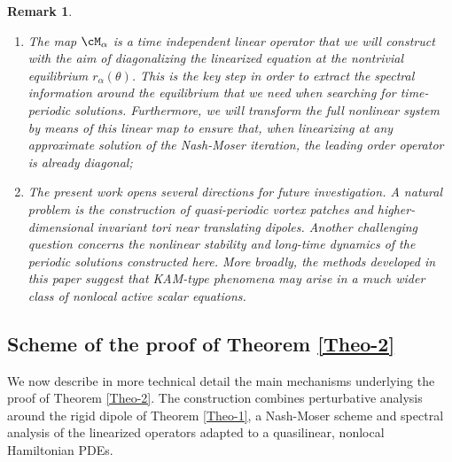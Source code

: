 \documentclass[a4paper,reqno,10pt]{article}
\newtheorem{rem}{Remark}[section]
\begin{document}
\begin{rem}
\begin{enumerate}[label=(\roman*)]
On the other hand, the mode $\tJ=1$ is excluded as it is degenerate. Nevertheless, the existence of solutions that are mode-1 time-periodic perturbations of steady solutions might be investigated without preserving the translation invariance of the dipole and by performing a more refined analysis close to the degeneracy;
\item The map $\cM_{\alpha}$ is a time independent linear operator that we will construct with the aim of diagonalizing the linearized equation at the nontrivial equilibrium $r_\alpha(\theta)$. This is the key step in order to extract the spectral information around the equilibrium that we need when searching for time-periodic solutions. Furthermore, we will transform the full nonlinear system by means of this linear map to ensure that, when linearizing at any approximate solution of the Nash-Moser iteration, the leading order operator is already diagonal; 
\item The present work opens several directions for future investigation. 
A natural problem is the construction of quasi-periodic vortex patches and higher-dimensional invariant tori near translating dipoles. 
Another challenging question concerns the nonlinear stability and long-time dynamics of the periodic solutions constructed here. 
More broadly, the methods developed in this paper suggest that KAM-type phenomena may arise in a much wider class of nonlocal active scalar equations.
\end{enumerate}
\end{rem}


\subsection{Scheme of the proof of Theorem \ref{Theo-2}}

We now describe in more technical detail the main mechanisms underlying the proof 
of Theorem \ref{Theo-2}. The construction combines perturbative analysis around the rigid 
dipole of Theorem \ref{Theo-1}, a Nash-Moser scheme and spectral analysis of the linearized operators adapted to a 
quasilinear, nonlocal Hamiltonian PDEs.

\end{document}
